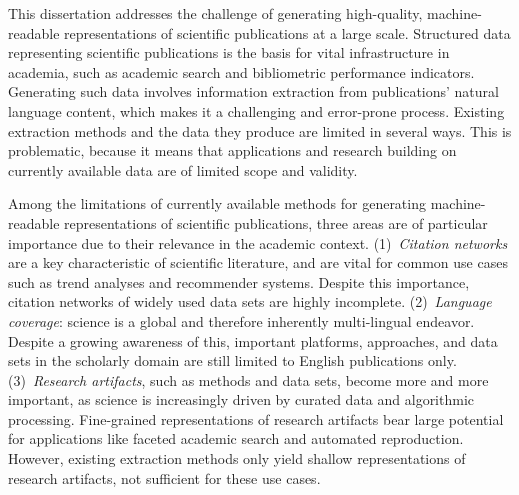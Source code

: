 \Abstract{}
This dissertation addresses the challenge of generating high-quality, machine-readable representations of scientific publications at a large scale.
Structured data representing scientific publications is the basis for vital infrastructure in academia, such as academic search and bibliometric performance indicators. %
Generating such data involves information extraction from publications' natural language content, which makes it a challenging and error-prone process.
Existing extraction methods and the data they produce are limited in several ways. %
This is problematic, because it means that applications and research building on currently available data are of limited scope and validity.

Among the limitations of currently available methods for generating machine-readable representations of scientific publications, three areas are of particular importance due to their relevance in the academic context.
(1)~\emph{Citation networks} are a key characteristic of scientific literature, and are vital for common use cases such as trend analyses and recommender systems. Despite this importance, 
citation networks of widely used data sets are highly incomplete.
(2)~\emph{Language coverage}: science is a global and therefore inherently multi-lingual endeavor.
Despite a growing awareness of this, %
important platforms, approaches, and data sets in the scholarly domain are still limited to English publications only.
(3)~\emph{Research artifacts}, such as methods and data sets, become more and more important, as science is increasingly driven by curated data and algorithmic processing. Fine-grained representations of research artifacts bear large potential for applications like faceted academic search and automated reproduction. However, existing extraction methods only yield shallow representations of research artifacts, not sufficient for these use cases.

